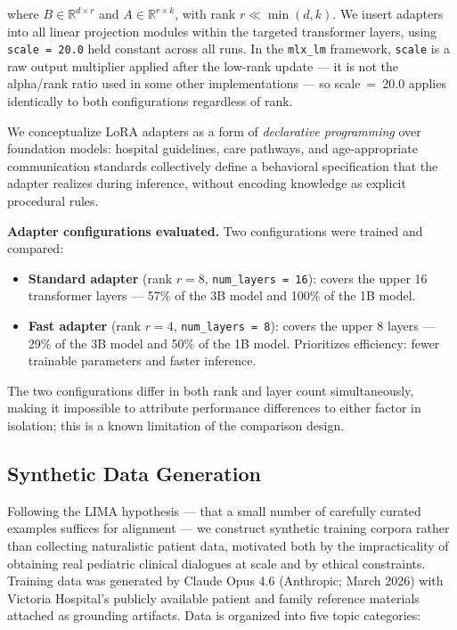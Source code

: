 \documentclass[journal]{IEEEtai}
\begin{document}
where $B \in \mathbb{R}^{d \times r}$ and $A \in \mathbb{R}^{r \times k}$, with rank $r \ll \min(d, k)$. We insert adapters into all linear projection modules within the targeted transformer layers, using \texttt{scale = 20.0} held constant across all runs. In the \texttt{mlx\_lm} framework, \texttt{scale} is a raw output multiplier applied after the low-rank update --- it is not the alpha/rank ratio used in some other implementations --- so scale~=~20.0 applies identically to both configurations regardless of rank.

We conceptualize LoRA adapters as a form of \textit{declarative programming} over foundation models: hospital guidelines, care pathways, and age-appropriate communication standards collectively define a behavioral specification that the adapter realizes during inference, without encoding knowledge as explicit procedural rules.

\textbf{Adapter configurations evaluated.} Two configurations were trained and compared:

\begin{itemize}
    \item \textbf{Standard adapter} (rank $r = 8$, \texttt{num\_layers = 16}): covers the upper 16 transformer layers --- 57\% of the 3B model and 100\% of the 1B model.
    \item \textbf{Fast adapter} (rank $r = 4$, \texttt{num\_layers = 8}): covers the upper 8 layers --- 29\% of the 3B model and 50\% of the 1B model. Prioritizes efficiency: fewer trainable parameters and faster inference.
\end{itemize}

The two configurations differ in both rank and layer count simultaneously, making it impossible to attribute performance differences to either factor in isolation; this is a known limitation of the comparison design.

\subsection{Synthetic Data Generation}

Following the LIMA hypothesis \cite{zhou2023lima} --- that a small number of carefully curated examples suffices for alignment --- we construct synthetic training corpora rather than collecting naturalistic patient data, motivated both by the impracticality of obtaining real pediatric clinical dialogues at scale and by ethical constraints. Training data was generated by Claude Opus 4.6 (Anthropic; March 2026) with Victoria Hospital's publicly available patient and family reference materials attached as grounding artifacts. Data is organized into five topic categories:
\end{document}
